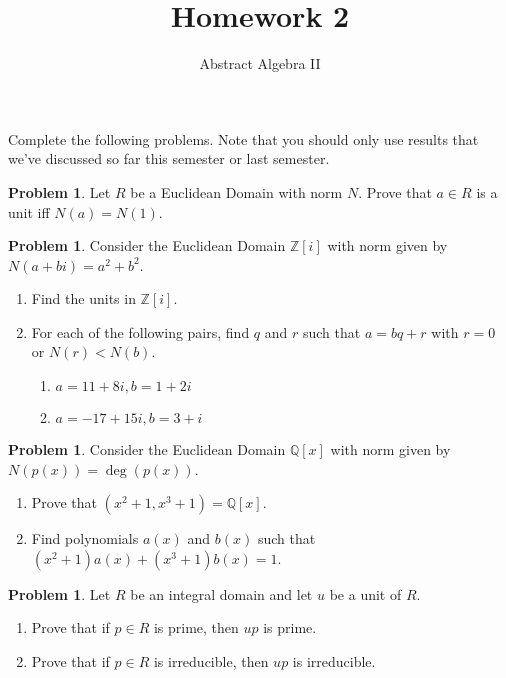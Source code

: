 \documentclass[11pt]{scrartcl}
\theoremstyle{definition}
\newtheorem{problem}[theorem]{Problem}
\begin{document}
\title{Homework 2}
\subtitle{Abstract Algebra II}
\date{}

\maketitle
\thispagestyle{fancy}

Complete the following problems. Note that you should only use results that we've discussed so far this semester or last semester.

\begin{problem}
Let $R$ be a Euclidean Domain with norm $N$.  Prove that $a\in R$ is a unit iff $N(a)=N(1)$.
\end{problem}

\begin{problem}
Consider the Euclidean Domain $\mathbb{Z}[i]$ with norm given by $N(a+bi)=a^2+b^2$.  
\begin{enumerate}[label=\rm{(\alph*)}]
\item Find the units in $\mathbb{Z}[i]$.
\item For each of the following pairs, find $q$ and $r$ such that $a=bq+r$ with $r=0$ or $N(r)<N(b)$.
\begin{enumerate}[label=\rm{(\roman*)}]
\item $a=11+8i,b=1+2i$
\item $a=-17+15i,b=3+i$
\end{enumerate}
\end{enumerate}
\end{problem}

\begin{problem}
Consider the Euclidean Domain $\mathbb{Q}[x]$ with norm given by $N(p(x))=\deg(p(x))$. 
\begin{enumerate}[label=\rm{(\alph*)}]
\item Prove that $(x^2+1,x^3+1)=\mathbb{Q}[x]$.
\item Find polynomials $a(x)$ and $b(x)$ such that $(x^2+1)a(x)+(x^3+1)b(x)=1$.
\end{enumerate}
\end{problem}

\begin{problem}
Let $R$ be an integral domain and let $u$ be a unit of $R$.
\begin{enumerate}[label=\rm{(\alph*)}]
\item Prove that if $p\in R$ is prime, then $up$ is prime.
\item Prove that if $p\in R$ is irreducible, then $up$ is irreducible.
\end{enumerate}
\end{problem}
\end{document}
